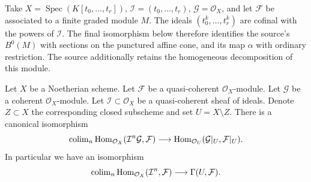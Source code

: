 \begin{lemma}
\label{lemma-homs-over-open}
\begin{reference}
\cite[Chapter III, \S 4, no. 69, definition of $B^0(M)$, the map
$\alpha$, and Remark, pp. 262--263]{FAC}
\end{reference}
\begin{history}
Take $X=\operatorname{Spec}(K[t_0,\ldots,t_r])$,
$\mathcal I=(t_0,\ldots,t_r)$, $\mathcal G=\mathcal O_X$, and let
$\mathcal F$ be associated to a finite graded module $M$. The ideals
$(t_0^k,\ldots,t_r^k)$ are cofinal with the powers of $\mathcal I$.
The final isomorphism below therefore identifies the source's
$B^0(M)$ with sections on the punctured affine cone, and its map $\alpha$
with ordinary restriction. The source additionally retains the homogeneous
decomposition of this module.
\end{history}
Let $X$ be a Noetherian scheme.
Let $\mathcal{F}$ be a quasi-coherent $\mathcal{O}_X$-module.
Let $\mathcal{G}$ be a coherent $\mathcal{O}_X$-module.
Let $\mathcal{I} \subset \mathcal{O}_X$ be a quasi-coherent sheaf of
ideals. Denote $Z \subset X$ the corresponding closed subscheme and
set $U = X \setminus Z$.
There is a canonical isomorphism
$$
\mathop{\mathrm{colim}}\nolimits_n \mathop{\mathrm{Hom}}\nolimits_{\mathcal{O}_X}(\mathcal{I}^n\mathcal{G}, \mathcal{F})
\longrightarrow
\mathop{\mathrm{Hom}}\nolimits_{\mathcal{O}_U}(\mathcal{G}|_U, \mathcal{F}|_U).
$$
In particular we have an isomorphism
$$
\mathop{\mathrm{colim}}\nolimits_n \mathop{\mathrm{Hom}}\nolimits_{\mathcal{O}_X}(
\mathcal{I}^n, \mathcal{F})
\longrightarrow
\Gamma(U, \mathcal{F}).
$$
\end{lemma}

